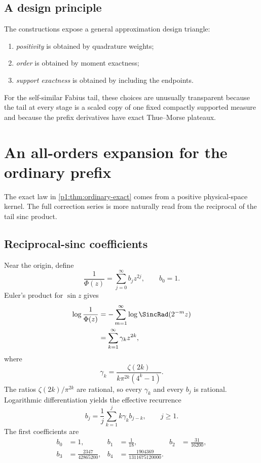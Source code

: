 \documentclass[11pt]{article}
\numberwithin{equation}{section}
\theoremstyle{definition}
\theoremstyle{remark}
\begin{document}
\subsection{A design principle}

The constructions expose a general approximation design triangle:
\begin{enumerate}
\item \emph{positivity} is obtained by quadrature weights;
\item \emph{order} is obtained by moment exactness;
\item \emph{support exactness} is obtained by including the endpoints.
\end{enumerate}
For the self-similar Fabius tail, these choices are unusually transparent because the tail at every stage is a scaled copy of one fixed compactly supported measure and because the prefix derivatives have exact Thue--Morse plateaux.

\section{An all-orders expansion for the ordinary prefix}
\label{p1:sec:reciprocal-sinc}

The exact law in \cref{p1:thm:ordinary-exact} comes from a positive physical-space kernel.  The full correction series is more naturally read from the reciprocal of the tail sinc product.

\subsection{Reciprocal-sinc coefficients}

Near the origin, define
\begin{equation}
 \frac1{\Phi(z)}=\sum_{j=0}^{\infty}b_jz^{2j},
 \qquad b_0=1.
 \label{p1:eq:B-reciprocal}
\end{equation}
Euler's product for $\sin z$ gives
\begin{align}
 \log\frac1{\Phi(z)}
 &=-\sum_{m=1}^{\infty}\log\SincRad(2^{-m}z)\nonumber\\
 &=\sum_{k=1}^{\infty}\gamma_kz^{2k},
 \label{p1:eq:log-reciprocal-Phi}
\end{align}
where
\begin{equation}
 \boxed{
 \gamma_k=\frac{\zeta(2k)}{k\pi^{2k}(4^k-1)}.}
 \label{p1:eq:gamma-k}
\end{equation}
The ratios $\zeta(2k)/\pi^{2k}$ are rational, so every $\gamma_k$ and every $b_j$ is rational.  Logarithmic differentiation yields the effective recurrence
\begin{equation}
 \boxed{
 b_j=\frac1j\sum_{k=1}^{j}k\gamma_kb_{j-k},
 \qquad j\ge1.}
 \label{p1:eq:b-recurrence}
\end{equation}
The first coefficients are
\begin{align}
 b_0&=1,&
 b_1&=\frac1{18},&
 b_2&=\frac{31}{16200},\label{p1:eq:b-low-1}\\
 b_3&=\frac{2347}{42865200},&
 b_4&=\frac{1904369}{1311675120000}.\label{p1:eq:b-low-2}
\end{align}
\end{document}
